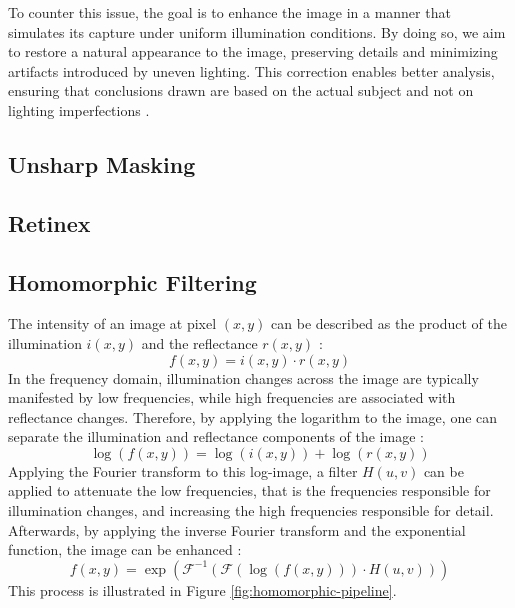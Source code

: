 \documentclass[sigconf]{acmart}
\begin{document}
To counter this issue, the goal is to enhance the image in a manner that simulates its capture under uniform illumination conditions. By doing so, we aim to restore a natural appearance to the image, preserving details and minimizing artifacts introduced by uneven lighting. This correction enables better analysis, ensuring that conclusions drawn are based on the actual subject and not on lighting imperfections \cite{dey2019uneven}.

\subsection{Unsharp Masking}\label{sec:unsharp}

\subsection{Retinex}\label{sec:retinex}

\subsection{Homomorphic Filtering}\label{sec:homomorphic}
The intensity of an image at pixel $(x,y)$ can be described as the product of the illumination $i(x,y)$ and the reflectance $r(x,y)$ \cite{voicu1997practical,fan2011homomorphic}:
\begin{equation}
	f(x,y) = i(x,y) \cdot r(x,y)
\end{equation}
In the frequency domain, illumination changes across the image are typically manifested by low frequencies, while high frequencies are associated with reflectance changes. Therefore, by applying the logarithm to the image, one can separate the illumination and reflectance components of the image \cite{voicu1997practical,fan2011homomorphic}:
\begin{equation}
	\log(f(x,y)) = \log(i(x,y)) + \log(r(x,y))
\end{equation}
Applying the Fourier transform to this log-image, a filter $H(u,v)$ can be applied to attenuate the low frequencies, that is the frequencies responsible for illumination changes, and increasing the high frequencies responsible for detail. Afterwards, by applying the inverse Fourier transform and the exponential function, the image can be enhanced \cite{voicu1997practical,fan2011homomorphic}:
\begin{equation}
	f(x,y) = \exp(\mathcal{F}^{-1}(\mathcal{F}(\log(f(x,y))) \cdot H(u,v)))
\end{equation}
This process is illustrated in Figure \ref{fig:homomorphic-pipeline}.
\end{document}
